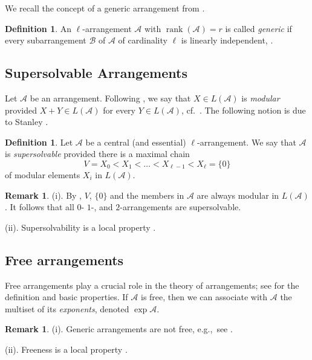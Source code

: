 \documentclass[12pt]{amsart}
\newcommand\CA{{\mathscr A}}
\newcommand\CB{{\mathscr B}}
\newcommand\rank{\operatorname{rank}}
\numberwithin{equation}{section}
\theoremstyle{plain}
\theoremstyle{definition}
\newtheorem{defn}[equation]{Definition}
\newtheorem{remark}[equation]{Remark}
\begin{document}
We recall the concept of a generic arrangement from \cite[Def.~5.22]{orlikterao:arrangements}.

\begin{defn}
	\label{def:generic}
	An $\ell$-arrangement $\CA$ with $\rank(\CA)=r$ is called \emph{generic} if 
	every subarrangement $\CB$ of $\CA$ of cardinality $\ell$ is linearly independent, \cite[Def.~5.22]{orlikterao:arrangements}.
\end{defn}

\subsection{Supersolvable Arrangements}
\label{ssect:super}

Let $\CA$ be an arrangement.
Following \cite[\S 2]{orlikterao:arrangements}, we say
that $X \in L(\CA)$ is \emph{modular}
provided $X + Y \in L(\CA)$ for every $Y \in L(\CA)$, 
cf.\ \cite[Def.\ 2.32, Cor.\ 2.26]{orlikterao:arrangements}.
The following notion is due to Stanley \cite{stanley:super}. 

\begin{defn}
	\label{def:super}
	Let $\CA$ be a central (and essential) $\ell$-arrangement.
	We say that $\CA$ is \emph{supersolvable} 
	provided there is a maximal chain
	\[
	V = X_0 < X_1 < \ldots < X_{\ell-1} < X_\ell = \{0\}
	\]
	of modular elements $X_i$ in $L(\CA)$.
\end{defn}

\begin{remark}
	\label{rem:ss}
	(i).
	By \cite[Ex.\ 2.28]{orlikterao:arrangements}, 
	$V$, $\{0\}$ and the members in $\CA$ 
	are always modular in $L(\CA)$.
	It follows  that all $0$- $1$-, and $2$-arrangements are supersolvable.
	
	(ii). Supersolvability is a local property  \cite[Prop.~3.2]{stanley:super}.
\end{remark}

\subsection{Free arrangements}
\label{ssect:free}

Free arrangements play a crucial role in the theory of arrangements;
see \cite[\S 4]{orlikterao:arrangements} for the definition and
basic properties. If $\CA$ is free, then
we can associate with $\CA$ the multiset of its \emph{exponents},
denoted $\exp \CA$. 

\begin{remark}
	\label{rem:free}
	(i).
	Generic arrangements are not free, e.g.,~see \cite[\S 4.4]{roseterao}.
	
(ii). Freeness is a local property  \cite[Thm.~4.37]{orlikterao:arrangements}.
\end{remark}
\end{document}
